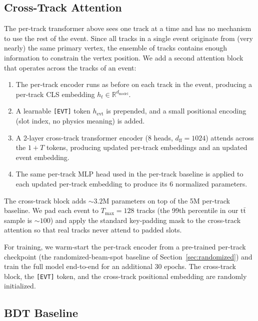 \documentclass[11pt]{article}
\begin{document}
\subsection{Cross-Track Attention}
\label{sec:methods_crosstrack}

The per-track transformer above sees one track at a time and has no mechanism to use the rest of the event.
Since all tracks in a single event originate from (very nearly) the same primary vertex, the ensemble of tracks contains enough information to constrain the vertex position.
We add a second attention block that operates across the tracks of an event:

\begin{enumerate}
    \item The per-track encoder runs as before on each track in the event, producing a per-track CLS embedding $h_t \in \mathbb{R}^{d_\text{model}}$.
    \item A learnable \texttt{[EVT]} token $h_\text{evt}$ is prepended, and a small positional encoding (slot index, no physics meaning) is added.
    \item A 2-layer cross-track transformer encoder (8 heads, $d_\text{ff} = 1024$) attends across the $1 + T$ tokens, producing updated per-track embeddings and an updated event embedding.
    \item The same per-track MLP head used in the per-track baseline is applied to each updated per-track embedding to produce its 6 normalized parameters.
\end{enumerate}

The cross-track block adds $\sim 3.2$M parameters on top of the 5M per-track baseline. We pad each event to $T_\text{max} = 128$ tracks (the 99th percentile in our $\text{t}\bar{\text{t}}$ sample is $\sim 100$) and apply the standard key-padding mask to the cross-track attention so that real tracks never attend to padded slots.

For training, we warm-start the per-track encoder from a pre-trained per-track checkpoint (the randomized-beam-spot baseline of Section~\ref{sec:randomized}) and train the full model end-to-end for an additional 30 epochs. The cross-track block, the \texttt{[EVT]} token, and the cross-track positional embedding are randomly initialized.

\subsection{BDT Baseline}
\end{document}
